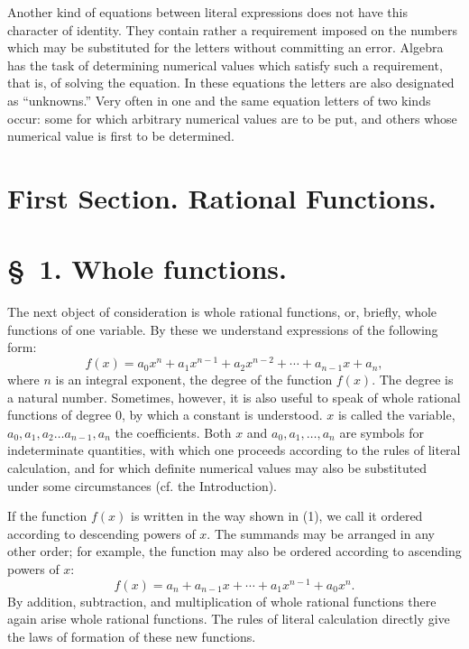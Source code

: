 \documentclass[11pt]{article}
\begin{document}
Another kind of equations between literal expressions does not have this character of identity. They contain rather a requirement imposed on the numbers which may be substituted for the letters without committing an error. Algebra has the task of determining numerical values which satisfy such a requirement, that is, of solving the equation. In these equations the letters are also designated as ``unknowns.'' Very often in one and the same equation letters of two kinds occur: some for which arbitrary numerical values are to be put, and others whose numerical value is first to be determined.

\clearpage
\clearpage

\section*{First Section. Rational Functions.}

\section*{\S~1. Whole functions.}

The next object of consideration is whole rational functions, or, briefly, whole functions of one variable. By these we understand expressions of the following form:
\begin{equation}
 f(x)=a_0x^n+a_1x^{n-1}+a_2x^{n-2}+\cdots+a_{n-1}x+a_n,
\tag{1}
\end{equation}
where $n$ is an integral exponent, the degree of the function $f(x)$. The degree is a natural number. Sometimes, however, it is also useful to speak of whole rational functions of degree $0$, by which a constant is understood. $x$ is called the variable, $a_0,a_1,a_2\ldots a_{n-1},a_n$ the coefficients. Both $x$ and $a_0,a_1,\ldots,a_n$ are symbols for indeterminate quantities, with which one proceeds according to the rules of literal calculation, and for which definite numerical values may also be substituted under some circumstances (cf. the Introduction).

If the function $f(x)$ is written in the way shown in (1), we call it ordered according to descending powers of $x$. The summands may be arranged in any other order; for example, the function may also be ordered according to ascending powers of $x$:
\[
 f(x)=a_n+a_{n-1}x+\cdots+a_1x^{n-1}+a_0x^n.
\]
By addition, subtraction, and multiplication of whole rational functions there again arise whole rational functions. The rules of literal calculation directly give the laws of formation of these new functions.
\end{document}
